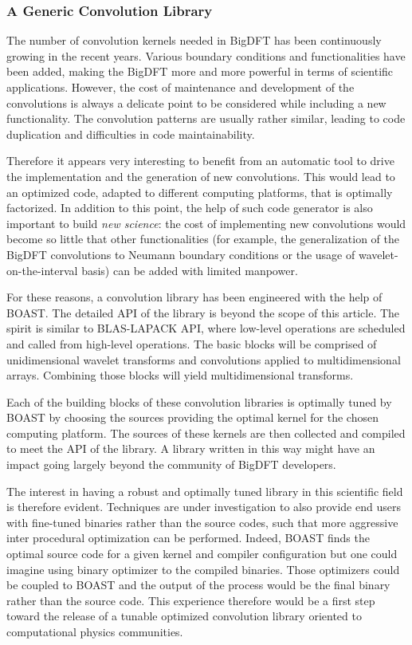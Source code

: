 \documentclass{IEEEtran}
\begin{document}
\subsubsection{A Generic Convolution Library}

The number of convolution kernels needed in BigDFT has been continuously
growing in the recent years.  Various boundary conditions and functionalities
have been added, making the BigDFT more and more powerful in terms of
scientific applications.  However, the cost of maintenance and development of
the convolutions is always a delicate point to be considered while including a
new functionality.  The convolution patterns are usually rather similar,
leading to code duplication and difficulties in code maintainability.

Therefore it appears very interesting to benefit from an automatic tool to drive
the implementation and the generation of new convolutions.  This would lead to
an optimized code, adapted to different computing platforms, that is optimally
factorized.  In addition to this point, the help of such code generator is also
important to build \emph{new science}: the cost of implementing new
convolutions would become so little that other functionalities (for example,
the generalization of the BigDFT convolutions to Neumann boundary conditions
or the usage of wavelet-on-the-interval basis) can be added with limited
manpower.

For these reasons, a convolution library has been engineered with the help of
BOAST. The detailed API of the library is beyond the scope of this article. The
spirit is similar to BLAS-LAPACK API, where low-level operations are scheduled
and called from high-level operations. The basic blocks will be comprised of
unidimensional wavelet transforms and convolutions applied to multidimensional
arrays. Combining those blocks will yield multidimensional transforms.

Each of the building blocks of these convolution libraries is optimally tuned by
BOAST by choosing the sources providing the optimal kernel for the chosen
computing platform.  The sources of these kernels are then collected and
compiled to meet the API of the library. A library written in this way might
have an impact going largely beyond the community of BigDFT developers. 

The interest in having a robust and optimally tuned library in this scientific
field is therefore evident. Techniques are under investigation to also provide
end users with fine-tuned binaries rather than the source codes, such that more
aggressive inter procedural optimization can be performed. Indeed, BOAST finds
the optimal source code for a given kernel and compiler configuration but one
could imagine using binary optimizer to the compiled binaries. Those optimizers
could be coupled to BOAST and the output of the process would be the final
binary rather than the source code. This experience therefore would be a first
step toward the release of a tunable optimized convolution library oriented to
computational physics communities.
\end{document}
